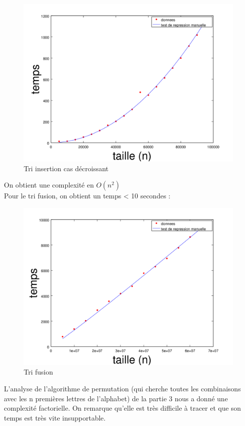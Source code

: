 \documentclass{article}
\begin{document}
\begin{figure}
	\begin{center}
		\includegraphics[scale=0.7]{decroissant}\\
		Tri insertion cas décroissant
	\end{center}
\end{figure}
On obtient une complexité en $O(n^2)$\\
Pour le tri fusion, on obtient un temps < 10 secondes :
\begin{figure}
	\begin{center}
		\includegraphics[scale=0.7]{fusion}\\
		Tri fusion
	\end{center}
\end{figure}
L'analyse de l'algorithme de permutation (qui cherche toutes les combinaisons avec les n premières lettres de l'alphabet) de la partie 3 nous a donné une complexité factorielle. On remarque qu'elle est très difficile à tracer et que son temps est très vite insupportable.
\end{document}
